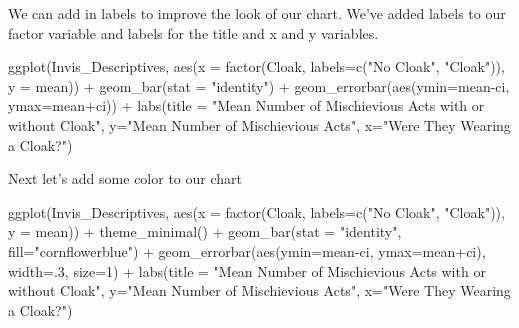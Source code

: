 \documentclass[
]{book}
\newenvironment{Shaded}{\begin{snugshade}}{\end{snugshade}}
\newcommand{\AttributeTok}[1]{\textcolor[rgb]{0.77,0.63,0.00}{#1}}
\newcommand{\DecValTok}[1]{\textcolor[rgb]{0.00,0.00,0.81}{#1}}
\newcommand{\FunctionTok}[1]{\textcolor[rgb]{0.00,0.00,0.00}{#1}}
\newcommand{\NormalTok}[1]{#1}
\newcommand{\SpecialCharTok}[1]{\textcolor[rgb]{0.00,0.00,0.00}{#1}}
\newcommand{\StringTok}[1]{\textcolor[rgb]{0.31,0.60,0.02}{#1}}
\begin{document}
We can add in labels to improve the look of our chart.
We've added labels to our factor variable and labels for
the title and x and y variables.

\begin{Shaded}
\begin{Highlighting}[]
\FunctionTok{ggplot}\NormalTok{(Invis\_Descriptives, }
       \FunctionTok{aes}\NormalTok{(}\AttributeTok{x =} \FunctionTok{factor}\NormalTok{(Cloak, }\AttributeTok{labels=}\FunctionTok{c}\NormalTok{(}\StringTok{"No Cloak"}\NormalTok{, }\StringTok{"Cloak"}\NormalTok{)),}
           \AttributeTok{y =}\NormalTok{ mean)) }\SpecialCharTok{+}
  \FunctionTok{geom\_bar}\NormalTok{(}\AttributeTok{stat =} \StringTok{"identity"}\NormalTok{) }\SpecialCharTok{+}
  \FunctionTok{geom\_errorbar}\NormalTok{(}\FunctionTok{aes}\NormalTok{(}\AttributeTok{ymin=}\NormalTok{mean}\SpecialCharTok{{-}}\NormalTok{ci,}
                    \AttributeTok{ymax=}\NormalTok{mean}\SpecialCharTok{+}\NormalTok{ci)) }\SpecialCharTok{+}
  \FunctionTok{labs}\NormalTok{(}\AttributeTok{title =} \StringTok{"Mean Number of Mischievious Acts with or without Cloak"}\NormalTok{, }
       \AttributeTok{y=}\StringTok{"Mean Number of Mischievious Acts"}\NormalTok{, }\AttributeTok{x=}\StringTok{"Were They Wearing a Cloak?"}\NormalTok{)}
\end{Highlighting}
\end{Shaded}

Next let's add some color to our chart

\begin{Shaded}
\begin{Highlighting}[]
\FunctionTok{ggplot}\NormalTok{(Invis\_Descriptives, }
       \FunctionTok{aes}\NormalTok{(}\AttributeTok{x =} \FunctionTok{factor}\NormalTok{(Cloak, }\AttributeTok{labels=}\FunctionTok{c}\NormalTok{(}\StringTok{"No Cloak"}\NormalTok{, }\StringTok{"Cloak"}\NormalTok{)),}
           \AttributeTok{y =}\NormalTok{ mean)) }\SpecialCharTok{+}
  \FunctionTok{theme\_minimal}\NormalTok{() }\SpecialCharTok{+}
  \FunctionTok{geom\_bar}\NormalTok{(}\AttributeTok{stat =} \StringTok{"identity"}\NormalTok{, }\AttributeTok{fill=}\StringTok{"cornflowerblue"}\NormalTok{) }\SpecialCharTok{+}
  \FunctionTok{geom\_errorbar}\NormalTok{(}\FunctionTok{aes}\NormalTok{(}\AttributeTok{ymin=}\NormalTok{mean}\SpecialCharTok{{-}}\NormalTok{ci,}
                    \AttributeTok{ymax=}\NormalTok{mean}\SpecialCharTok{+}\NormalTok{ci), }\AttributeTok{width=}\NormalTok{.}\DecValTok{3}\NormalTok{, }\AttributeTok{size=}\DecValTok{1}\NormalTok{) }\SpecialCharTok{+}
  \FunctionTok{labs}\NormalTok{(}\AttributeTok{title =} \StringTok{"Mean Number of Mischievious Acts with or without Cloak"}\NormalTok{, }
       \AttributeTok{y=}\StringTok{"Mean Number of Mischievious Acts"}\NormalTok{, }\AttributeTok{x=}\StringTok{"Were They Wearing a Cloak?"}\NormalTok{)}
\end{Highlighting}
\end{Shaded}
\end{document}
